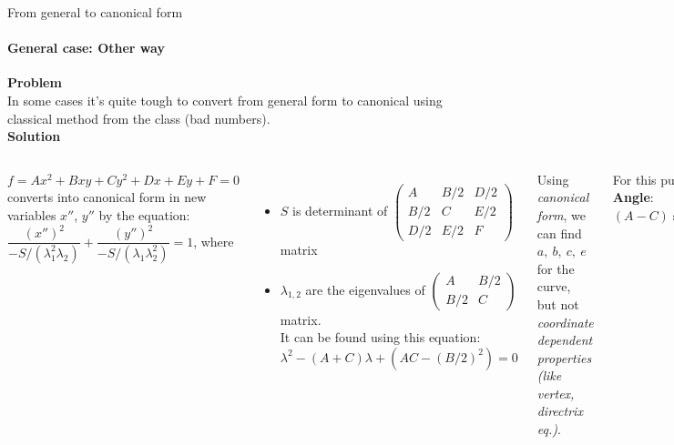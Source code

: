 \documentclass[aspectratio=169]{beamer}
\begin{document}
\begin{frame}[t]{From general to canonical form}
\framesubtitle{General case: Other way}
\scriptsize
\vspace{-0.3cm}
\textbf{Problem}\\
In some cases it's quite tough to convert from general form to canonical using classical method from the class (bad numbers).\\
\textbf{Solution} \smallskip
\begin{columns}[onlytextwidth]
$f = Ax^{2}+Bxy+Cy^{2}+Dx+Ey+F=0$ \\
converts into canonical form in new variables ${x''}$, ${y''}$ by the equation:
$
    {\dfrac {{({x}'')}^{2}}{-S/(\lambda _{1}^{2}\lambda _{2})}}+{\dfrac {{({y}'')}^{2}}{-S/(\lambda _{1}\lambda _{2}^{2})}}=1
$, where \\
\begin{itemize}
    \item $S$ is determinant of $\left({\begin{matrix}A&B/2&D/2\\B/2&C&E/2\\D/2&E/2&F\end{matrix}}\right)$ matrix 
\item $\lambda_{1,2}$ are the eigenvalues of  $\left({\begin{matrix}A&B/2\\B/2&C\end{matrix}}\right)$ matrix.\\
It can be found using this equation:
$
    \lambda ^{2}-(A+C)\lambda +(AC-(B/2)^{2})=0
$
\end{itemize}
Using \textit{canonical form}, we can find $a,\ b,\ c,\ e$ for the curve, but not \textit{coordinate dependent properties (like vertex, directrix eq.)}.

For this purpose, we need to find \textbf{angle} and \textbf{shift}.\\
\textbf{Angle}: $(A-C)\sin(2\alpha) + B\cos(2\alpha) = 0; \rightarrow \alpha = ...$

\textbf{Shift (center of the curve)}
\begin{equation*}
    \left\{\begin{matrix*}[l] \frac{\partial f}{\partial x}\\ \frac{\partial f}{\partial y} \end{matrix*}\right. \rightarrow \text{2 equations of line} \rightarrow \text{solve system } (x_c;y_c)
\end{equation*}


\end{columns}
\end{frame}
\end{document}
